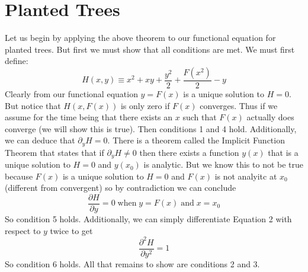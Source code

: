 \documentclass{article}
\begin{document}
\section{Planted Trees}

Let us begin by applying the above theorem to our functional equation for planted trees. But first we must show that all conditions are met. We must first define:
\begin{equation}
H(x,y) \equiv x^2+xy+\frac{y^2}{2}+\frac{F(x^2)}{2}-y
\end{equation}
Clearly from our functional equation \(y=F(x)\) is a unique solution to \(H=0\). But notice that \(H(x,F(x))\) is only zero if \(F(x)\) converges. Thus if we assume for the time being that there exists an \(x\) such that  \(F(x)\) actually does converge (we will show this is true). Then conditions 1 and 4  hold. Additionally, we can deduce that \(\partial_y H =0\). There is a theorem called the Implicit Function Theorem that states that if \(\partial_y H \neq 0\) then there exists a function \(y(x)\) that is a unique solution to \(H=0\) and \(y(x_0)\) is analytic. But we know this to not be true because \(F(x)\) is a unique solution to \(H=0\) and \(F(x)\) is not analyitc at \(x_0\) (different from convergent) so by contradiction we can conclude 
\begin{equation}
\frac{\partial H}{\partial y} =0 \; \text{when} \; y=F(x) \; \text{and} \; x=x_0
\end{equation}
 So condition 5 holds. Additionally, we can simply differentiate Equation 2 with respect to \(y\) twice to get 
\begin{equation}
\frac{\partial^2 H}{\partial y^2} = 1
\end{equation}
So condition 6 holds. All that remains to show are conditions 2 and 3. 
\end{document}
